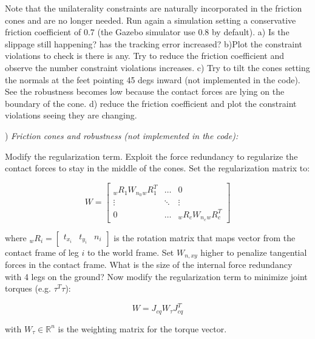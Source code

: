 \documentclass[11pt]{article}
\newcommand{\Rnum}{\mathbb{R}} %
\newcommand{\mat}[1]{\ensuremath{\begin{bmatrix}#1\end{bmatrix}}}	%
\begin{document}
Note that the unilaterality constraints are naturally incorporated in the friction cones and are no longer needed.
Run again a simulation setting a conservative friction coefficient of 0.7 (the Gazebo simulator use 0.8 by default).
a) Is the slippage still happening? has the tracking error increased?
b)Plot the constraint violations to check is there is any. Try to reduce the friction coefficient and observe 
the number constraint violations increases. 
c) Try to tilt the cones setting the normals at the feet pointing 45 degs inward (not implemented in the code). 
See the robustness becomes low because the contact forces are lying on the boundary of the cone. 
d) reduce the friction coefficient and plot the constraint violations seeing they are changing. 


\quad

) \textit{Friction cones and robustness  (not implemented in the code):}

Modify the regularization term. Exploit the force redundancy to regularize the contact forces to stay in the middle of the cones. 
Set the regularization matrix to:

\begin{equation}
W = \mat{ {}_wR_1 W_{n_0} {}_wR_1^T &  \dots & 0 \\ \vdots & \ddots & \vdots \\ 0 & \dots &    {}_wR_c W_{n_c} {}_wR_c^T }
\end{equation}

%
where ${}_wR_i=\mat{t_{x_i} & t_{y_i} & n_i}$ is the rotation matrix that maps vector from the contact frame of leg $i$ to the world frame.
Set $W_{n,xy}$  higher to penalize tangential forces in the contact frame.
What is the size of the internal force redundancy with 4 legs on the ground? 
Now modify the regularization term to minimize joint torques (e.g. $\tau^T\tau$):

\begin{equation}
W = J_{cq} W_{\tau}  J_{cq}^T
\end{equation}

with $W_\tau \in \Rnum^n$ is the weighting matrix for the torque vector.
\end{document}
